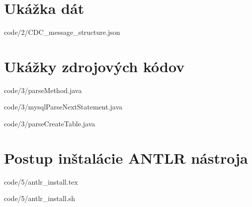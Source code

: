 \appendix	
\printnomenclature
\label{apx:zkratky}
\chapter{Ukážka dát}


            {code/2/CDC_message_structure.json}

\chapter{Ukážky zdrojových kódov}


            {code/3/parseMethod.java}


            {code/3/mysqlParseNextStatement.java}


            {code/3/parseCreateTable.java}

\chapter{Postup inštalácie ANTLR nástroja}


            {code/5/antlr_install.tex}


            {code/5/antlr_install.sh}


